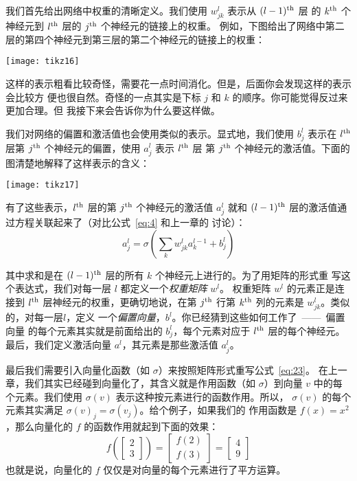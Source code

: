 我们首先给出网络中权重的清晰定义。我们使用 $w^l_{jk}$ 表示从 $(l-1)^{\rm th}$ 层
的 $k^{\rm th}$ 个神经元到 $l^{\rm th}$ 层的 $j^{\rm th}$ 个神经元的链接上的权重。
例如，下图给出了网络中第二层的第四个神经元到第三层的第二个神经元的链接上的权重：

\begin{center}
  \texttt{[image: tikz16]}
\end{center}

这样的表示粗看比较奇怪，需要花一点时间消化。但是，后面你会发现这样的表示会比较方
便也很自然。奇怪的一点其实是下标 $j$ 和 $k$ 的顺序。你可能觉得反过来更加合理。但
我接下来会告诉你为什么要这样做。

我们对网络的偏置和激活值也会使用类似的表示。显式地，我们使用 $b^l_j$ 表示在
$l^{\rm th}$ 层第 $j^{\rm th}$ 个神经元的偏置，使用 $a^l_j$ 表示 $l^{\rm th}$ 层
第 $j^{\rm th}$ 个神经元的激活值。下面的图清楚地解释了这样表示的含义：

\begin{center}
  \texttt{[image: tikz17]}
\end{center}

有了这些表示，$l^{\rm th}$ 层的第 $j^{\rm th}$ 个神经元的激活值 $a^{l}_j$ 就和
$(l-1)^{\rm th}$ 层的激活值通过方程关联起来了（对比公式~\eqref{eq:4} 和上一章的
  讨论）：
\begin{equation}
  a^{l}_j = \sigma\left( \sum_k w^{l}_{jk} a^{l-1}_k + b^l_j \right)
  \label{eq:23}\tag{23}
\end{equation}

其中求和是在 $(l-1)^{\rm th}$ 层的所有 $k$ 个神经元上进行的。为了用矩阵的形式重
写这个表达式，我们对每一层 $l$ 都定义一个\emph{权重矩阵} $w^l$。
权重矩阵 $w^l$ 的元素正是连接到 $l^{\rm th}$ 层神经元的权重，更确切地说，在第
$j^{\rm th}$ 行第 $k^{\rm th}$ 列的元素是 $w^l_{jk}$。类似的，对每一层$l$，定义
一个\emph{偏置向量}，$b^l$。你已经猜到这些如何工作了~——~偏置向量
的每个元素其实就是前面给出的 $b^l_j$，每个元素对应于 $l^{\rm th}$ 层的每个神经元。
最后，我们定义激活向量 $a^l$，其元素是那些激活值 $a^l_j$。

最后我们需要引入向量化函数（如 $\sigma$）来按照矩阵形式重写公式~\eqref{eq:23}。
在上一章，我们其实已经碰到向量化了，其含义就是作用函数（如 $\sigma$）到向量 $v$
中的每个元素。我们使用 $\sigma(v)$ 表示这种按元素进行的函数作用。所以，
$\sigma(v)$ 的每个元素其实满足 $\sigma(v)_j = \sigma(v_j)$。给个例子，如果我们的
作用函数是 $f(x) = x^2$，那么向量化的 $f$ 的函数作用就起到下面的效果：
\begin{equation}
  f\left(\left[ \begin{array}{c} 2 \\ 3 \end{array} \right] \right)
  = \left[ \begin{array}{c} f(2) \\ f(3) \end{array} \right]
  = \left[ \begin{array}{c} 4 \\ 9 \end{array} \right]
\label{eq:24}\tag{24}
\end{equation}
也就是说，向量化的 $f$ 仅仅是对向量的每个元素进行了平方运算。

